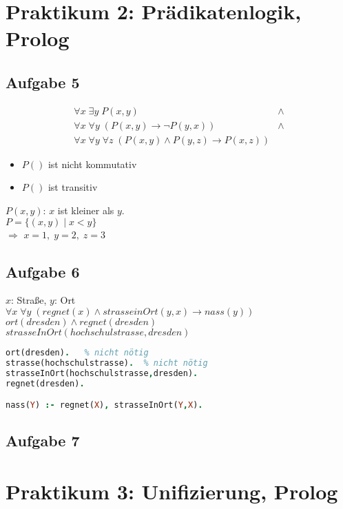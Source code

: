 \documentclass{scrreprt}
\begin{document}
\chapter{Praktikum 2: Prädikatenlogik, Prolog}
\section{Aufgabe 5}
\begin{align*}
&\forall x \;\exists y \;P(x,y) &\wedge&\\
&\forall x \; \forall y \; (P(x,y) \to \neg P(y,x)) &\wedge&\\
&\forall x \; \forall y \; \forall z \; (P(x,y) \wedge P(y,z) \to P(x,z))&&
\end{align*}
\begin{itemize}
\item $P()$ ist nicht kommutativ
\item $P()$ ist transitiv
\end{itemize}
$P(x,y)$: $x$ ist kleiner als $y$.\\
$P=\{(x,y) \;|\; x< y\}$\\
$\Rightarrow$ $x=1,\; y=2,\; z=3$

\section{Aufgabe 6}
$x$: Straße, $y$: Ort\\
$\forall x \; \forall y \; ( regnet(x) \wedge strasseinOrt(y,x) \to nass(y) )$\bigskip\\
$ort(dresden) \wedge regnet(dresden) $\\
$strasseInOrt(hochschulstrasse,dresden)$

\begin{lstlisting}[language=Prolog]
ort(dresden).	% nicht nötig
strasse(hochschulstrasse).	% nicht nötig
strasseInOrt(hochschulstrasse,dresden).
regnet(dresden).

nass(Y) :- regnet(X), strasseInOrt(Y,X).
\end{lstlisting}

\section{Aufgabe 7}


\chapter{Praktikum 3: Unifizierung, Prolog}
\end{document}
